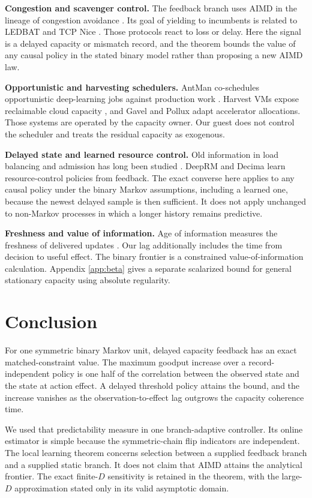 \documentclass[10pt,conference,letterpaper]{IEEEtran}
\begin{document}
\textbf{Congestion and scavenger control.}
The feedback branch uses AIMD in the lineage of congestion avoidance
\cite{chiujain}. Its goal of yielding to incumbents is related to LEDBAT
\cite{ledbat} and TCP Nice \cite{tcpnice}. Those protocols react to loss or delay.
Here the signal is a delayed capacity or mismatch record, and the theorem bounds
the value of any causal policy in the stated binary model rather than proposing a
new AIMD law.

\textbf{Opportunistic and harvesting schedulers.}
AntMan co-schedules opportunistic deep-learning jobs against production work
\cite{antman}. Harvest VMs expose reclaimable cloud capacity \cite{harvestvm},
and Gavel \cite{gavel} and Pollux \cite{pollux} adapt accelerator allocations.
Those systems are operated by the capacity owner. Our guest does not control the
scheduler and treats the residual capacity as exogenous.

\textbf{Delayed state and learned resource control.}
Old information in load balancing and admission has long been studied
\cite{mitzenmacher,goel,kim1985,brooks1972,katsikopoulos}. DeepRM
\cite{deeprm} and Decima \cite{decima} learn resource-control policies from
feedback. The exact converse here applies to any causal policy under the binary
Markov assumptions, including a learned one, because the newest delayed sample is
then sufficient. It does not apply unchanged to non-Markov processes in which a
longer history remains predictive.

\textbf{Freshness and value of information.}
Age of information measures the freshness of delivered updates \cite{aoi}. Our
lag additionally includes the time from decision to useful effect. The binary
frontier is a constrained value-of-information calculation. Appendix
\ref{app:beta} gives a separate scalarized bound for general stationary capacity
using absolute regularity.

\section{Conclusion}
\label{sec:concl}
For one symmetric binary Markov unit, delayed capacity feedback has an exact
matched-constraint value. The maximum goodput increase over a record-independent
policy is one half of the correlation between the observed state and the state at
action effect. A delayed threshold policy attains the bound, and the increase
vanishes as the observation-to-effect lag outgrows the capacity coherence time.

We used that predictability measure in one branch-adaptive controller. Its online
estimator is simple because the symmetric-chain flip indicators are independent.
The local learning theorem concerns selection between a supplied feedback branch
and a supplied static branch. It does not claim that AIMD attains the analytical
frontier. The exact finite-$D$ sensitivity is retained in the theorem, with the
large-$D$ approximation stated only in its valid asymptotic domain.
\end{document}

